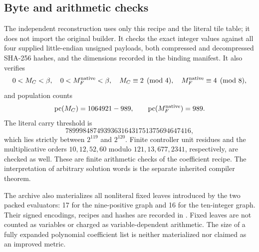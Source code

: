 \subsection{Byte and arithmetic checks}
The independent reconstruction uses only this recipe and the literal
tile table; it does not import the original builder. It checks the
exact integer values against all four supplied little-endian unsigned
payloads, both compressed and decompressed SHA-256 hashes, and the
dimensions recorded in the binding manifest. It also verifies
\[
0<M_C<\beta,\quad 0<M_F^{\rm native}<\beta,\quad
M_C\equiv2\pmod4,\quad M_F^{\rm native}\equiv4\pmod8,
\]
and population counts
\[
 \operatorname{pc}(M_C)=1064921-989,\qquad \operatorname{pc}(M_F^{\rm native})=989.
\]
The literal carry threshold is
\[
 789998487493936316431751375694647416,
\]
which lies strictly between $2^{119}$ and $2^{120}$. Finite controller
unit residues and the multiplicative orders $10,12,52,60$ modulo
$121,13,677,2341$, respectively, are checked as well. These are finite
arithmetic checks of the coefficient recipe. The interpretation of
arbitrary solution words is the separate inherited compiler theorem.

The archive also materializes all nonliteral fixed leaves introduced
by the two packed evaluators: 17 for the nine-positive graph and 16
for the ten-integer graph. Their signed encodings, recipes and hashes
are recorded in . Fixed leaves are not
counted as variables or charged as variable-dependent arithmetic.
The size of a fully expanded polynomial coefficient list is neither
materialized nor claimed as an improved metric.

